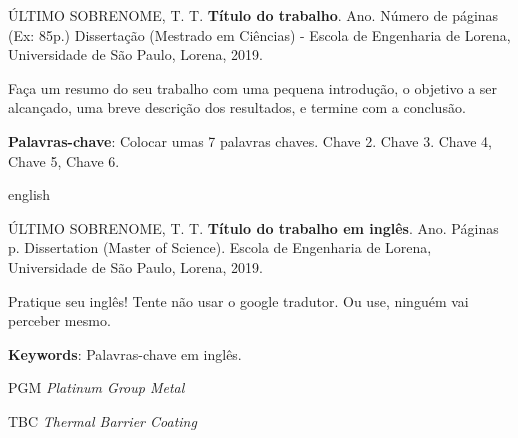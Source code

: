 \documentclass[
	12pt,				%
	openright,			%
	twoside,			%
	a4paper,			%
	english,			%
	french,				%
	spanish,			%
	brazil				%
	]{abntex2}
\begin{document}

\setlength{\absparsep}{18pt} %
\begin{resumo}[RESUMO]
	
\'ULTIMO SOBRENOME, T. T. \textbf{Título do trabalho}. Ano. Número de páginas (Ex: 85p.) Dissertação (Mestrado em Ciências) - Escola de Engenharia de Lorena, Universidade de São Paulo, Lorena, 2019.

Faça um resumo do seu trabalho com uma pequena introdução, o objetivo a ser alcançado, uma breve descrição dos resultados, e termine com a conclusão.

 \textbf{Palavras-chave}: Colocar umas 7 palavras chaves. Chave 2. Chave 3. Chave 4, Chave 5, Chave 6.
 
 
\end{resumo}

\begin{resumo}[ABSTRACT]
 \begin{otherlanguage*}{english}
 	
\'ULTIMO SOBRENOME, T. T. \textbf{Título do trabalho em inglês}. Ano. Páginas p. Dissertation (Master of Science). Escola de Engenharia de Lorena, Universidade de São Paulo, Lorena, 2019.

Pratique seu inglês! Tente não usar o google tradutor. Ou use, ninguém vai perceber mesmo.
 
   \noindent 
   \textbf{Keywords}: Palavras-chave em inglês.
     
 \end{otherlanguage*}
\end{resumo}
  

\listoffigures*
\cleardoublepage

\listoftables*
\cleardoublepage

\begin{siglas}
	\item[PGM] \textit{Platinum Group Metal}
	\item[TBC] \textit{Thermal Barrier Coating}
	
\end{siglas}


\end{document}

